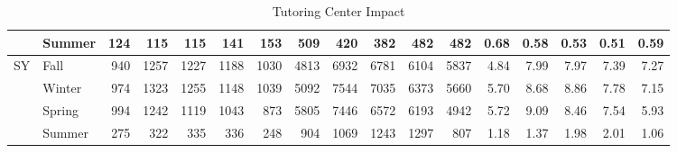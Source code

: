 \begin{sidewaystable}[!h]
\begin{tabular}{llrrrrr|rrrrr|rrrrr}
					&Summer&	124&	115&	115&	141&	153&		509&	420&	382&	482&482&			0.68&0.58&0.53&0.51&0.59\\
\midrule
\multirow{4}{*}{SY}		&Fall&		940&	1257&1227&1188&1030&	4813&6932&6781&6104&	5837&	4.84&7.99&7.97&7.39&7.27\\
					&Winter&		974&	1323&1255&1148&1039&	5092&7544&7035&6373&	5660&	5.70&8.68&8.86&7.78&7.15\\
					&Spring&		994&	1242&1119&1043&873&	5805&7446&6572&6193&	4942&	5.72&9.09&8.46&7.54&5.93\\
					&Summer&	275&	322&	335&	336&	248&		904&1069&1243&1297&807&		1.18&1.37&1.98&2.01&1.06\\
\bottomrule
\end{tabular}
\caption{Tutoring Center Impact}\label{app:tut:tab:SLC}
\end{sidewaystable}

\restoregeometry
\fancyheadoffset[LE,LO]{3cm}

